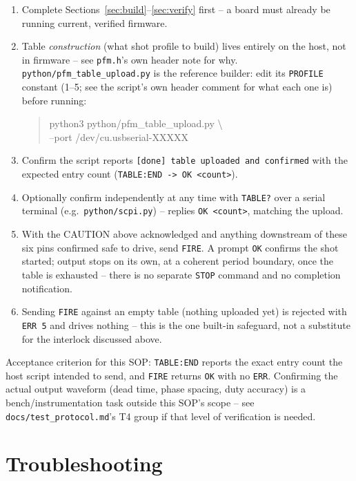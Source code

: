 \documentclass[11pt]{article}
\newcommand{\code}[1]{\texttt{#1}}
\begin{document}
\begin{enumerate}[label=\arabic*.]
  \item Complete Sections~\ref{sec:build}--\ref{sec:verify} first --
    a board must already be running current, verified firmware.
  \item Table \emph{construction} (what shot profile to build) lives
    entirely on the host, not in firmware -- see \code{pfm.h}'s own
    header note for why. \code{python/pfm\_table\_upload.py} is the
    reference builder: edit its \code{PROFILE} constant (1--5; see the
    script's own header comment for what each one is) before running:
\begin{quote}\ttfamily\small\raggedright
python3 python/pfm\_table\_upload.py \textbackslash\\
\hspace*{1em}--port /dev/cu.usbserial-XXXXX
\end{quote}
  \item Confirm the script reports \code{[done] table uploaded and
    confirmed} with the expected entry count (\code{TABLE:END -> OK
    <count>}).
  \item Optionally confirm independently at any time with \code{TABLE?}
    over a serial terminal (e.g.\ \code{python/scpi.py}) -- replies
    \code{OK <count>}, matching the upload.
  \item With the CAUTION above acknowledged and anything downstream of
    these six pins confirmed safe to drive, send \code{FIRE}. A prompt
    \code{OK} confirms the shot started; output stops on its own, at a
    coherent period boundary, once the table is exhausted -- there is
    no separate \code{STOP} command and no completion notification.
  \item Sending \code{FIRE} against an empty table (nothing uploaded
    yet) is rejected with \code{ERR 5} and drives nothing -- this is
    the one built-in safeguard, not a substitute for the interlock
    discussed above.
\end{enumerate}

Acceptance criterion for this SOP: \code{TABLE:END} reports the exact
entry count the host script intended to send, and \code{FIRE} returns
\code{OK} with no \code{ERR}. Confirming the actual output waveform
(dead time, phase spacing, duty accuracy) is a bench/instrumentation
task outside this SOP's scope -- see \code{docs/test\_protocol.md}'s T4
group if that level of verification is needed.

\section{Troubleshooting}
\end{document}
